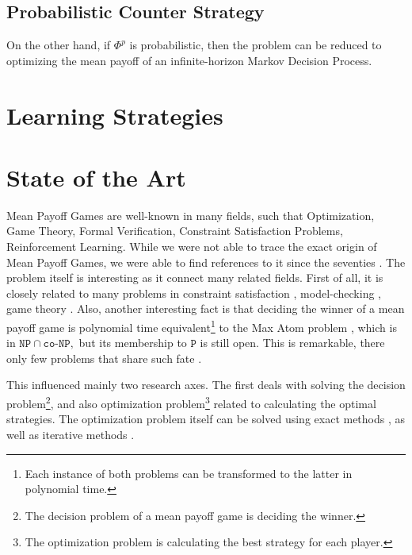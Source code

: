 \subsection{Probabilistic Counter Strategy}
On the other hand, if $\Phi^p$ is probabilistic, then the problem can be reduced to optimizing the mean payoff of an infinite-horizon Markov Decision Process.

\section{Learning Strategies}
\section{State of the Art}
Mean Payoff Games are well-known in many fields, such that Optimization\cite{SimplexMPG}, Game Theory\cite{PositionalStrategies}, Formal Verification\cite{OmegaSpecsMPG}, Constraint Satisfaction Problems\cite{TropicalCSP,MPGMaxAtom}, Reinforcement Learning\cite{StrategyImprovement}.
\newline While we were not able to trace the exact origin of Mean Payoff Games, we were able to find references to it since the seventies \cite{PositionalStrategies}. The problem itself is interesting as it connect many related fields. First of all, it is closely related to many problems in constraint satisfaction \cite{TropicalCSP,MPGMaxAtom}, model-checking \cite{OmegaSpecsMPG}, game theory \cite{PositionalStrategies}.
\newline Also, another interesting fact is that deciding the winner of a mean payoff game is polynomial time equivalent\footnote{Each instance of both problems can be transformed to the latter in polynomial time.} to the Max Atom problem \cite{MPGMaxAtom}, which is in $\texttt{NP}\cap \texttt{co-NP},$ but its membership to $\mathtt{P}$ is still open. This is remarkable, there only few problems that share such fate \cite{NPInterCoNP}.


This influenced mainly two research axes. The first deals with solving the decision problem\footnote{The decision problem of a mean payoff game is deciding the winner.}, and also optimization problem\footnote{The optimization problem is calculating the best strategy for each player.} related to calculating the optimal strategies. 
\newline The optimization problem itself can be solved using exact methods \cite{MPGMaxAtom}, as well as iterative methods \cite{StrategyImprovement,SimplexMPG}.

